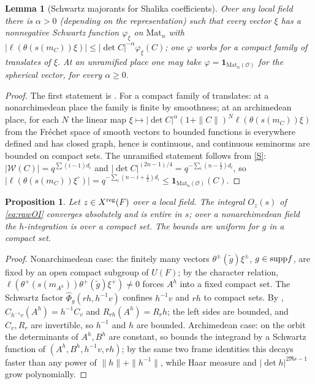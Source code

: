 \documentclass[11pt,oneside,notitlepage]{book}
\numberwithin{equation}{section}
\theoremstyle{plain}
\newtheorem{proposition}[theorem]{Proposition}
\newtheorem{lemma}[theorem]{Lemma}
\theoremstyle{definition}
\newcommand{\cO}{\mathcal{O}}
\newcommand{\Mat}{\mathrm{Mat}}
\newcommand{\cW}{\mathcal{W}}
\newcommand{\one}{\mathbf{1}}
\begin{document}
\begin{lemma}[Schwartz majorants for Shalika coefficients]\label{lem:A-majorant}
Over any local field there is $\alpha>0$ (depending on the representation) such that every vector $\xi$ has a nonnegative Schwartz function $\varphi_\xi$ on $\Mat_n$ with $|\ell(\theta(s(m_C))\xi)|\le|\det C|^{-\alpha}\varphi_\xi(C)$; one $\varphi$ works for a compact family of translates of $\xi$. At an unramified place one may take $\varphi=\one_{\Mat_n(\cO)}$ for the spherical vector, for every $\alpha\ge0$.
\end{lemma}
\begin{proof}
The first statement is \cite[Claim 3.2]{KM}. For a compact family of translates: at a nonarchimedean place the family is finite by smoothness; at an archimedean place, for each $N$ the linear map $\xi\mapsto|\det C|^\alpha(1+\|C\|)^N\ell(\theta(s(m_C))\xi)$ from the Fr\'echet space of smooth vectors to bounded functions is everywhere defined and has closed graph, hence is continuous, and continuous seminorms are bounded on compact sets. The unramified statement follows from \ref{S}: $|\cW(C)|=q^{\sum(i-1)d_i}$ and $|\det C|^{(2n-1)/4}=q^{-\sum_i(n-\frac12)d_i}$, so $|\ell(\theta(s(m_C))\xi^\circ)|=q^{-\sum_i(n-i+\frac12)d_i}\le\one_{\Mat_n(\cO)}(C)$.
\end{proof}

\begin{proposition}\label{prop:A-local}
Let $z\in X^{\rm reg}(F)$ over a local field. The integral $O_z(s)$ of \eqref{eq:rawOI} converges absolutely and is entire in $s$; over a nonarchimedean field the $h$-integration is over a compact set. The bounds are uniform for $g$ in a compact set.
\end{proposition}
\begin{proof}
Nonarchimedean case: the finitely many vectors $\theta^\pm(\tilde g)\xi^\pm$, $g\in{\rm supp}f$, are fixed by an open compact subgroup of $U(F)$; by the character relation, $\ell(\theta^+(s(m_{A^h}))\theta^+(\tilde g)\xi^+)\ne0$ forces $A^h$ into a fixed compact set. The Schwartz factor $\widehat\Phi_g(rh,h^{-1}v)$ confines $h^{-1}v$ and $rh$ to compact sets. By , $C_{h^{-1}v}(A^h)=h^{-1}C_v$ and $R_{rh}(A^h)=R_rh$; the left sides are bounded, and $C_v,R_r$ are invertible, so $h^{-1}$ and $h$ are bounded. Archimedean case: on the orbit the determinants of $A^h,B^h$ are constant, so  bounds the integrand by a Schwartz function of $(A^h,B^h,h^{-1}v,rh)$; by the same two frame identities this decays faster than any power of $\|h\|+\|h^{-1}\|$, while Haar measure and $|\det h|^{2\Re s-1}$ grow polynomially.
\end{proof}
\end{document}
